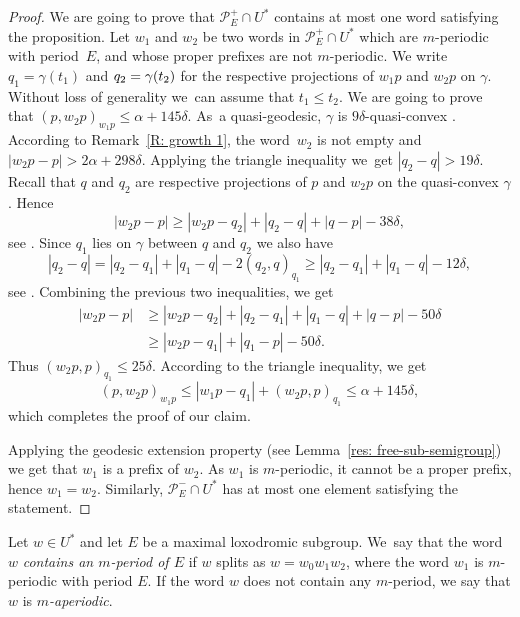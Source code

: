 \begin{proof}
We are going to prove that $\mathcal P^+_E \cap U^*$ contains at most one word satisfying the proposition.
Let $w_1$ and $w_2$ be two words in $\mathcal P^+_E \cap U^*$ which are $m$-periodic with period~$E$, and whose proper prefixes are not $m$-periodic.
We write $q_1 = \gamma(t_1)$ and $q_2 =\nobreak \gamma(t_2)$ for the respective projections of $w_1p$ and $w_2p$ on $\gamma$.
Without loss of generality we~can assume that $t_1 \leq t_2$.
We are going to prove that $(p, w_2p)_{w_1p} \leq \alpha + 145\delta$.
As~a quasi-geodesic, $\gamma$ is $9\delta$-quasi-convex \cite[Cor.\,2.7(2)]{coulon_geometry_2014}.
According to Remark~\ref{R: growth 1}, the word~$w_2$ is not empty and $|w_2p - p| > 2\alpha + 298\delta$.
Applying the triangle inequality we~get $|q_2-q| > 19\delta$.
Recall that $q$ and $q_2$ are respective projections of $p$ and $w_2p$ on the quasi-convex $\gamma$.
Hence
\begin{equation*}
|w_2p - p| \geq |w_2p - q_2| + |q_2 - q| + |q - p| - 38\delta,
\end{equation*}
see \cite[Cor.\,2.12(2)]{coulon_geometry_2014}.
Since $q_1$ lies on $\gamma$ between $q$ and $q_2$ we also have
\begin{equation*}
|q_2 - q| = |q_2 - q_1| + |q_1 - q| - 2(q_2,q)_{q_1}
\geq |q_2 - q_1| + |q_1 - q| - 12\delta,
\end{equation*}
see \cite[Cor.\,2.7(1)]{coulon_geometry_2014}.
Combining the previous two inequalities, we get
\begin{align*}
|w_2p - p| & \geq |w_2p - q_2| + |q_2 - q_1| + |q_1 - q| + |q - p| - 50\delta \\
& \geq |w_2p - q_1| + |q_1 - p| - 50\delta.
\end{align*}
Thus $(w_2p,p)_{q_1} \leq 25\delta$.
According to the triangle inequality, we get
\begin{equation*}
(p, w_2p)_{w_1p} \leq |w_1p - q_1| + (w_2p,p)_{q_1} \leq \alpha + 145\delta,
\end{equation*}
which completes the proof of our claim.

Applying the geodesic extension property (see Lemma~\ref{res: free-sub-semigroup}) we get that $w_1$ is a prefix of $w_2$.
As $w_1$ is $m$-periodic, it cannot be a proper prefix, hence $w_1 = w_2$.
Similarly, $\mathcal P^-_E \cap U^*$ has at most one element satisfying the statement.
\end{proof}


\begin{df} Let $w\in U^*$ and let $E$ be a maximal loxodromic subgroup.
We~say that the word $w$ \emph{contains an $m$-period of $E$} if $w$ splits as $w=w_0w_1w_2$, where the word $w_1$ is $m$-periodic with period $E$.
If the word $w$ does not contain any $m$-period, we say that $w$ is \emph{$m$-aperiodic}.
\end{df}

